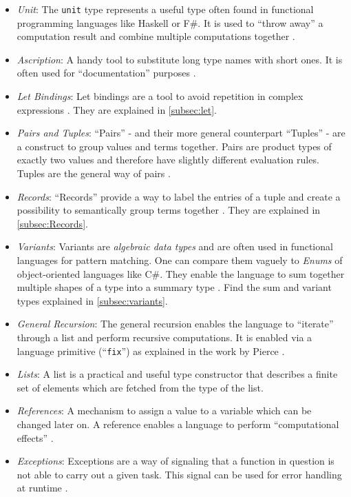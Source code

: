 \begin{itemize}
    \item \textit{Unit}: The \texttt{unit} type represents
          a useful type often found in functional
          programming languages like Haskell or F\#.
          It is used to ``throw away'' a computation result
          and combine multiple computations together \cite{pierce2002ProgLang}.
    \item \textit{Ascription}: A handy tool to substitute long type names with
          short ones. It is often used for ``documentation'' purposes \cite{pierce2002ProgLang}.
    \item \textit{Let Bindings}: Let bindings are a tool to
          avoid repetition in complex expressions \cite{pierce2002ProgLang}. They are explained in \cref{subsec:let}.
    \item \textit{Pairs and Tuples}: ``Pairs'' - and their more general counterpart
          ``Tuples'' - are a construct to group values and terms together.
          Pairs are product types of exactly two values
          and therefore have slightly different evaluation rules. Tuples are the general way
          of pairs \cite{pierce2002ProgLang}.
    \item \textit{Records}: ``Records'' provide a way to label the entries
          of a tuple and create a possibility to
          semantically group terms together \cite{pierce2002ProgLang}. They are explained in \cref{subsec:Records}.
    \item \textit{Variants}: Variants are \textit{algebraic data types} and are often used in functional
          languages for pattern matching. One can compare them vaguely to \textit{Enums} of
          object-oriented languages like C\#. They enable the language to sum together multiple
          shapes of a type into a summary type \cite{pierce2002ProgLang}. Find the sum
          and variant types explained in \cref{subsec:variants}.
    \item \textit{General Recursion}: The general recursion enables the language to
          ``iterate'' through a list and perform recursive computations. It is
          enabled via a language primitive (``\texttt{fix}'') as explained
          in the work by Pierce \cite{pierce2002ProgLang}.
    \item \textit{Lists}: A list is a practical and useful type constructor
          that describes a finite set of elements which are fetched from the
          type of the list. \cite{pierce2002ProgLang}
    \item \textit{References}: A mechanism to assign a value to a variable
          which can be changed later on. A reference enables a language to
          perform ``computational effects'' \cite{pierce2002ProgLang}.
    \item \textit{Exceptions}: Exceptions are a way of signaling that
          a function in question is not able to carry out a given task. This signal
          can be used for error handling at runtime \cite{pierce2002ProgLang}.
\end{itemize}


